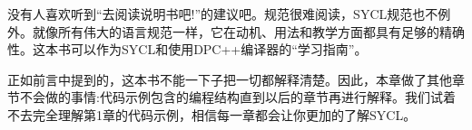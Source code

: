 没有人喜欢听到“去阅读说明书吧!”的建议吧。规范很难阅读，SYCL规范也不例外。就像所有伟大的语言规范一样，它在动机、用法和教学方面都具有足够的精确性。这本书可以作为SYCL和使用DPC++编译器的“学习指南”。\par

正如前言中提到的，这本书不能一下子把一切都解释清楚。因此，本章做了其他章节不会做的事情:代码示例包含的编程结构直到以后的章节再进行解释。我们试着不去完全理解第1章的代码示例，相信每一章都会让你更加的了解SYCL。\par







